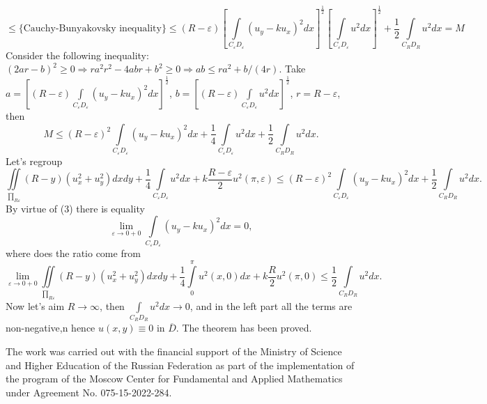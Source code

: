 \documentclass[11pt,twoside]{article}
\begin{document}
	\begin{equation*}
		\leq \{ \text{Cauchy-Bunyakovsky inequality}\} \leq\left(R - \varepsilon\right)\left[\int\limits_{C_\varepsilon D_\varepsilon}\left(u_y - ku_x\right)^2 dx \right]^{\frac12} \left[\int\limits_{C_\varepsilon D_\varepsilon} u^2 dx \right]^{\frac12} + \dfrac12 \int\limits_{C_RD_R} u^2 dx = M
	\end{equation*}
	Consider the following inequality: $(2ar - b)^2 \geq 0 \Rightarrow ra^2r^2 - 4abr+ b^2 \geq 0 \Rightarrow ab\leq ra^2 +b/ (4r)$. Take $a = \left[\left(R - \varepsilon\right)\int\limits_{C_\varepsilon D_\varepsilon} \left( u_y - ku_x\right)^2 dx \right]^{\frac12}$, $b = \left[\left(R - \varepsilon\right)\int\limits_{C_\varepsilon D_\varepsilon} u^2 dx \right]^{\frac12}$, $r =R - \varepsilon$, then
	\begin{equation*}
		M \leq \left(R - \varepsilon\right)^2 \int\limits_{C_\varepsilon D_\varepsilon} \left( u_y - ku_x\right)^2 dx + \dfrac14 \int\limits_{C_\varepsilon D_\varepsilon} u^2 dx + \dfrac12 \int\limits_{C_RD_R} u^2 dx.
	\end{equation*}
	Let's regroup
	\begin{equation*}
		\iint\limits_{\prod_{R\varepsilon}} \left(R - y\right) \left(u_x^2 + u_y^2\right) dx dy + \dfrac{1}{4}\int\limits_{C_\varepsilon D_\varepsilon} u^2 dx +k\dfrac{R - \varepsilon}{2}u^2(\pi, \varepsilon) \leq \left(R - \varepsilon\right)^2 \int\limits_{C_\varepsilon D_\varepsilon} \left( u_y - ku_x\right)^2 dx + \dfrac12 \int\limits_{C_RD_R} u^2 dx.
	\end{equation*}
	By virtue of (3) there is equality
	\begin{equation*}
		\lim\limits_{\varepsilon \to 0 + 0} \int\limits_{C_\varepsilon D_\varepsilon} \left(u_y - ku_x\right)^2 dx = 0,
	\end{equation*}
	where does the ratio come from
	\begin{equation*}
		\lim\limits_{\varepsilon \to 0 + 0} \iint\limits_{\prod_{R\varepsilon}} \left(R - y\right) \left(u_x^2 + u_y^2 \right) dx dy + \dfrac14 \int\limits_0^\pi u^2(x,0) dx + k\dfrac{R}{2}u^2(\pi,0) \leq \dfrac12 \int\limits_{C_RD_R} u^2 dx.
	\end{equation*}
	Now let's aim $R\to \infty$, then $\int\limits_{C_RD_R} u^2 dx\to 0$, and in the left part all the terms are non-negative,n hence $u(x,y) \equiv 0$ in $\overline{D}$. The theorem has been proved.
	\par
	
	
	\par
	The work was carried out with the financial support of the Ministry of Science and Higher Education of the Russian Federation as part of the implementation of the program of the Moscow Center for Fundamental and Applied Mathematics under Agreement No. 075-15-2022-284.
	\bigskip
	
\end{document}
